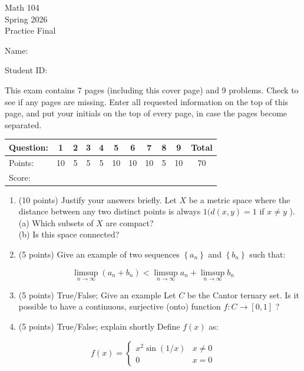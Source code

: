 \documentclass[10pt]{article}
\begin{document}
Math 104\\
Spring 2026\\
Practice Final

Name:

Student ID:

This exam contains 7 pages (including this cover page) and 9 problems. Check to see if any pages are missing. Enter all requested information on the top of this page, and put your initials on the top of every page, in case the pages become separated.

\begin{center}
\begin{tabular}{|l|c|c|c|c|c|c|c|c|c|c|}
\hline
Question: & 1 & 2 & 3 & 4 & 5 & 6 & 7 & 8 & 9 & Total \\
\hline
Points: & 10 & 5 & 5 & 5 & 10 & 10 & 10 & 5 & 10 & 70 \\
\hline
Score: &  &  &  &  &  &  &  &  &  &  \\
\hline
\end{tabular}
\end{center}

\begin{enumerate}
  \item (10 points) Justify your answers briefly. Let $X$ be a metric space where the distance between any two distinct points is always $1(d(x, y)=1$ if $x \neq y$ ).\\
(a) Which subsets of $X$ are compact?\\
(b) Is this space connected?
  \item (5 points) Give an example of two sequences $\left\{a_{n}\right\}$ and $\left\{b_{n}\right\}$ such that:
\end{enumerate}

$$
\limsup _{n \rightarrow \infty}\left(a_{n}+b_{n}\right)<\limsup _{n \rightarrow \infty} a_{n}+\limsup _{n \rightarrow \infty} b_{n}
$$

\begin{enumerate}
  \setcounter{enumi}{2}
  \item (5 points) True/False; Give an example Let $C$ be the Cantor ternary set. Is it possible to have a continuous, surjective (onto) function $f: C \rightarrow[0,1]$ ?
  \item (5 points) True/False; explain shortly Define $f(x)$ as:
\end{enumerate}

$$
f(x)= \begin{cases}x^{2} \sin (1 / x) & x \neq 0 \\ 0 & x=0\end{cases}
$$
\end{document}
